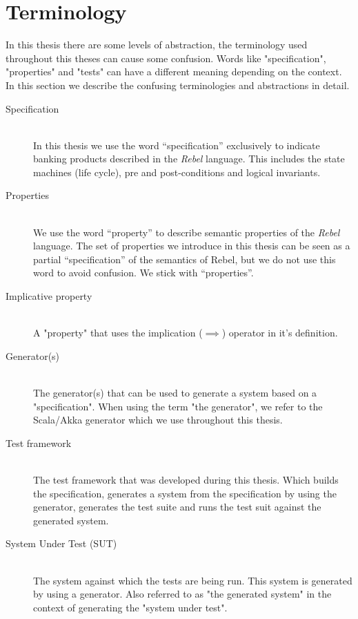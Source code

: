 \section{Terminology}
In this thesis there are some levels of abstraction, the terminology used throughout this theses can cause some confusion. Words like "specification", "properties" and "tests" can have a different meaning depending on the context. In this section we describe the confusing terminologies and abstractions in detail.

\begin{description}
\item[Specification]\hfill\\
In this thesis we use the word “specification” exclusively to indicate banking products described in the \textit{Rebel} language. This includes the state machines (life cycle), pre and post-conditions and logical invariants.

\item[Properties]\hfill\\
We use the word “property” to describe semantic properties of the \textit{Rebel} language. The set of properties we introduce in this thesis can be seen as a partial “specification” of the semantics of Rebel, but we do not use this word to avoid confusion. We stick with “properties”.

\item[Implicative property]\hfill\\
A "property" that uses the implication ($\implies$) operator in it's definition.

\item[Generator(s)]\hfill\\
The generator(s) that can be used to generate a system based on a "specification". When using the term "the generator", we refer to the Scala/Akka generator which we use throughout this thesis.

\item[Test framework]\hfill\\
The test framework that was developed during this thesis. Which builds the specification, generates a system from the specification by using the generator, generates the test suite and runs the test suit against the generated system.

\item[System Under Test (SUT)]\hfill\\
The system against which the tests are being run. This system is generated by using a generator. Also referred to as "the generated system" in the context of generating the "system under test".


\end{description}
